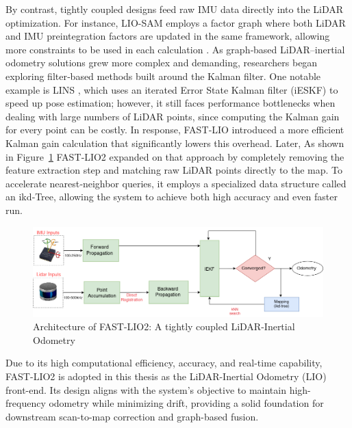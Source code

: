 By contrast, tightly coupled designs feed raw IMU data directly into the LiDAR optimization. For instance, LIO-SAM employs a factor graph where both LiDAR and IMU preintegration factors are updated in the same framework, allowing more constraints to be used in each calculation \cite{ShanEtAlLIOSAM2020}. As graph‐based LiDAR–inertial odometry solutions grew more complex and demanding, researchers began exploring filter‐based methods built around the Kalman filter. One notable example is LINS \cite{lins}, which uses an iterated Error State Kalman filter (iESKF) to speed up pose estimation; however, it still faces performance bottlenecks when dealing with large numbers of LiDAR points, since computing the Kalman gain for every point can be costly. In response, FAST‐LIO \cite{xuFastLIO2021} introduced a more efficient Kalman gain calculation that significantly lowers this overhead. Later, As shown in Figure~\ref{fig:fast_lio2_architecture} FAST‐LIO2 \cite{xuFastLIO2} expanded on that approach by completely removing the feature extraction step and matching raw LiDAR points directly to the map. To accelerate nearest‐neighbor queries, it employs a specialized data structure called an ikd‐Tree, allowing the system to achieve both high accuracy and even faster run.

\begin{figure}
    \centering
    \includegraphics[width=1 \linewidth]{images/fast_lio.drawio.png}
    \caption{Architecture of FAST-LIO2: A tightly coupled LiDAR-Inertial Odometry \cite{yin2021center}}
    \label{fig:fast_lio2_architecture}
\end{figure}

Due to its high computational efficiency, accuracy, and real-time capability, FAST-LIO2 is adopted in this thesis as the LiDAR-Inertial Odometry (LIO) front-end. Its design aligns with the system’s objective to maintain high-frequency odometry while minimizing drift, providing a solid foundation for downstream scan-to-map correction and graph-based fusion.

